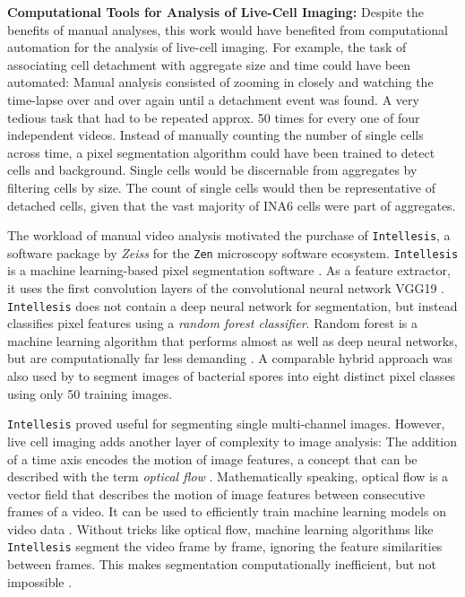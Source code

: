 \textbf{Computational Tools for Analysis of Live-Cell Imaging:}
Despite the benefits of manual analyses, this work would have benefited from
computational automation for the analysis of live-cell imaging. For example, the
task of associating \INA cell detachment with \INA aggregate size and time could
have been automated: Manual analysis consisted of zooming in closely and
watching the time-lapse over and over again until a detachment event was found.
A very tedious task that had to be repeated approx. 50 times for every one of
four independent videos. Instead of manually counting the number of single \INA
cells across time, a pixel segmentation algorithm could have been trained to
detect cells and background. Single cells would be discernable from aggregates
by filtering cells by size. The count of single cells would then be
representative of detached cells, given that the vast majority of INA6 cells
were part of aggregates.

The workload of manual video analysis motivated the purchase of
\texttt{Intellesis}, a software package by \textit{Zeiss} for the \texttt{Zen}
microscopy software ecosystem. \texttt{Intellesis} is a machine learning-based
pixel segmentation software \cite{ZeissOADFeature}. As a feature extractor, it
uses the first convolution layers of the convolutional neural network VGG19
\cite{simonyanVeryDeepConvolutional2015}. \texttt{Intellesis} does not contain a
deep neural network for segmentation, but instead classifies pixel features
using a \emph{random forest classifier}. Random forest is a machine learning
algorithm that  performs
almost as well as deep neural networks, but are computationally far less
demanding \cite{breimanRandomForests2001, richardsonDenseNeuralNetwork2023}. A
comparable hybrid approach was also used by
\citet{qamarHybridCNNRandomForest2023} to segment images of bacterial spores
into eight distinct pixel classes using only 50 training images.


\texttt{Intellesis} proved useful for segmenting single multi-channel images.
However, live cell imaging adds another layer of complexity to image analysis:
The addition of a time axis encodes the motion of image features, a concept that
can be described with the term \emph{optical flow}
\cite{niehorsterOpticFlowHistory2021}. Mathematically speaking, optical flow is
a vector field that describes the motion of image features between consecutive
frames of a video. It can be used to efficiently train machine learning models
on video data \cite{robitailleSelfsupervisedMachineLearning2022}. Without tricks
like optical flow, machine learning algorithms like \texttt{Intellesis} segment
the video frame by frame, ignoring the feature similarities between frames.
This makes segmentation computationally inefficient, but not impossible
\cite{pylvanainenLivecellImagingDeep2023}. 

